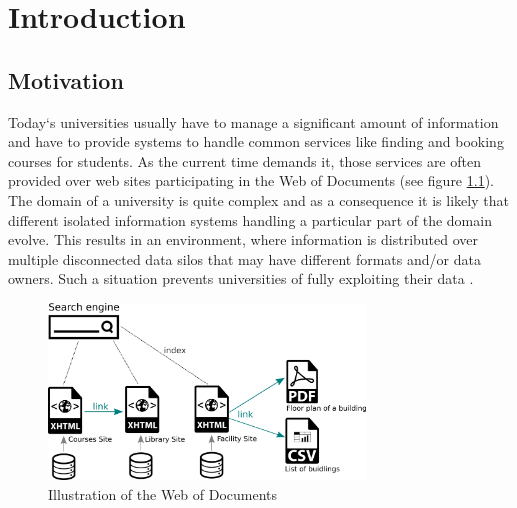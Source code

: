 \documentclass[draft,final]{vutinfth} %
\begin{document}

\tableofcontents %

\mainmatter

\chapter{Introduction}
\label{introduction-chapter}

\section{Motivation}
Today`s universities usually have to manage a significant amount of information and have to provide systems to handle common services like finding and booking courses for students. As the current time demands it, those services are often provided over web sites participating in the Web of Documents (see figure \ref{fig:motiviation-web-of-documents}). The domain of a university is quite complex and as a consequence it is likely that different isolated information systems handling a particular part of the domain evolve. This results in an environment, where information is distributed over multiple disconnected data silos that may have different formats and/or data owners. Such a situation prevents universities of fully exploiting their data \cite{zablith_consuming_2011}. 

\begin{figure}[h]
    \centering    
    \includegraphics[width=0.75\textwidth]{graphics/webOfDocuments.png}
    \caption{Illustration of the Web of Documents}
    \label{fig:motiviation-web-of-documents}
\end{figure}
\end{document}
